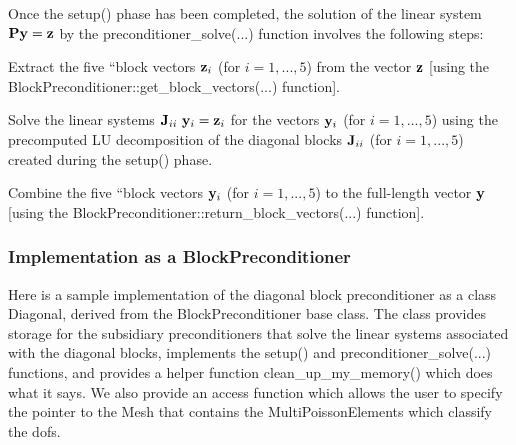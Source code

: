 Once the {\ttfamily setup()} phase has been completed, the solution of the linear system ${\bf P} {\bf y} = {\bf z}$ by the {\ttfamily preconditioner\+\_\+solve}(...) function involves the following steps\+:
\begin{DoxyItemize}
\item Extract the five ``block vectors\textquotesingle{}\textquotesingle{} ${\bf z}_i$ (for $i=1,...,5$) from the vector ${\bf z}$ \mbox{[}using the {\ttfamily Block\+Preconditioner\+::get\+\_\+block\+\_\+vectors}(...) function\mbox{]}.
\item Solve the linear systems ${\bf J}_{ii} \ {\bf y}_i = {\bf z}_i$ for the vectors ${\bf y}_i$ (for $i=1,...,5$) using the precomputed LU decomposition of the diagonal blocks ${\bf J}_{ii}$ (for $i=1,...,5$) created during the {\ttfamily setup()} phase.
\item Combine the five ``block vectors\textquotesingle{}\textquotesingle{} ${\bf y}_i$ (for $i=1,...,5$) to the full-\/length vector ${\bf y}$ \mbox{[}using the {\ttfamily Block\+Preconditioner\+::return\+\_\+block\+\_\+vectors}(...) function\mbox{]}.
\end{DoxyItemize}\hypertarget{index_diag_implementation}{}\subsubsection{Implementation as a Block\+Preconditioner}\label{index_diag_implementation}
Here is a sample implementation of the diagonal block preconditioner as a class {\ttfamily Diagonal}, derived from the {\ttfamily Block\+Preconditioner} base class. The class provides storage for the subsidiary preconditioners that solve the linear systems associated with the diagonal blocks, implements the {\ttfamily setup()} and {\ttfamily preconditioner\+\_\+solve}(...) functions, and provides a helper function {\ttfamily clean\+\_\+up\+\_\+my\+\_\+memory()} which does what it says. We also provide an access function which allows the user to specify the pointer to the {\ttfamily Mesh} that contains the {\ttfamily Multi\+Poisson\+Elements} which classify the dofs.

